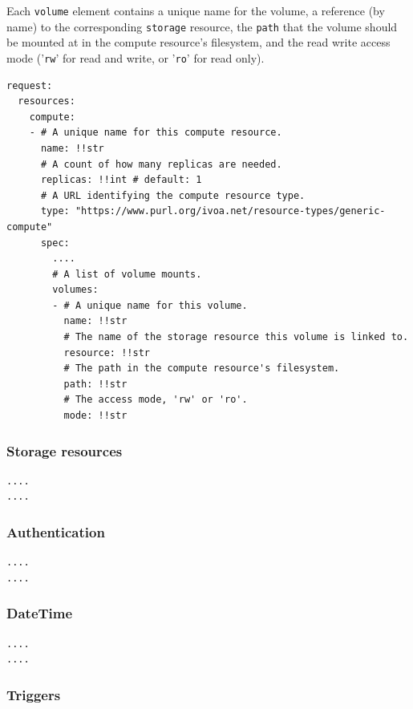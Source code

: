 \documentclass[11pt,a4paper]{ivoa}
\newcommand{\codeword}[1] {\texttt{#1}}
\begin{document}
Each \codeword{volume} element contains a unique name for the volume,
a reference (by name) to the corresponding \codeword{storage} resource,
the \codeword{path} that the volume should be mounted at in the
compute resource's filesystem, and the read write access mode
('\codeword{rw}' for read and write, or '\codeword{ro}' for read only).

\begin{lstlisting}[]
request:
  resources:
    compute:
    - # A unique name for this compute resource.
      name: !!str
      # A count of how many replicas are needed.
      replicas: !!int # default: 1
      # A URL identifying the compute resource type.
      type: "https://www.purl.org/ivoa.net/resource-types/generic-compute"
      spec:
        ....
        # A list of volume mounts.
        volumes:
        - # A unique name for this volume.
          name: !!str
          # The name of the storage resource this volume is linked to.
          resource: !!str
          # The path in the compute resource's filesystem.
          path: !!str
          # The access mode, 'rw' or 'ro'.
          mode: !!str
\end{lstlisting}

\subsubsection{Storage resources}
\label{datamodel-storage-resources}

\begin{lstlisting}[]
....
....
\end{lstlisting}

\subsubsection{Authentication}
\label{datamodel-authentication}

\begin{lstlisting}[]
....
....
\end{lstlisting}

\subsubsection{DateTime}
\label{datamodel-datetime}

\begin{lstlisting}[]
....
....
\end{lstlisting}

\subsubsection{Triggers}
\label{datamodel-triggers}
\end{document}

